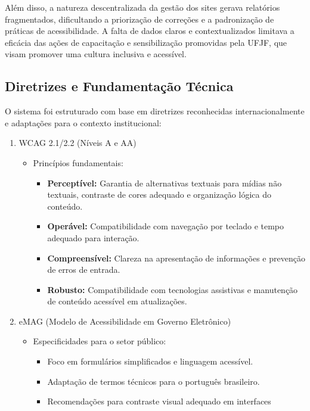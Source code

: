 \documentclass[12pt]{article}
\begin{document}
Além disso, a natureza descentralizada da gestão dos sites gerava relatórios
fragmentados, dificultando a priorização de correções e a padronização de práticas de
acessibilidade. A falta de dados claros e contextualizados limitava a eficácia das
ações de capacitação e sensibilização promovidas pela UFJF, que visam promover uma
cultura inclusiva e acessível.

\subsection{Diretrizes e Fundamentação Técnica}\label{subsec:diretrizes}
O sistema foi estruturado com base em diretrizes reconhecidas internacionalmente e
adaptações para o contexto institucional:

\begin{enumerate}
    \item WCAG 2.1/2.2 (Níveis A e AA)
    \begin{itemize}
        \item Princípios fundamentais: 
        \begin{itemize}
            \item \textbf{Perceptível:} Garantia de alternativas textuais para mídias não
            textuais, contraste de cores adequado e organização lógica do conteúdo.
            \item \textbf{Operável:} Compatibilidade com navegação por teclado e tempo
            adequado para interação.
            \item \textbf{Compreensível:} Clareza na apresentação de informações e
            prevenção de erros de entrada.
            \item \textbf{Robusto:} Compatibilidade com tecnologias assistivas e
            manutenção de conteúdo acessível em atualizações.
        \end{itemize}
    \end{itemize}
    \item eMAG (Modelo de Acessibilidade em Governo Eletrônico)
    \begin{itemize}
        \item Especificidades para o setor público:
        \begin{itemize}
            \item Foco em formulários simplificados e linguagem acessível.
            \item Adaptação de termos técnicos para o português brasileiro.
            \item Recomendações para contraste visual adequado em interfaces

\end{itemize}
\end{itemize}
\end{enumerate}
\end{document}
